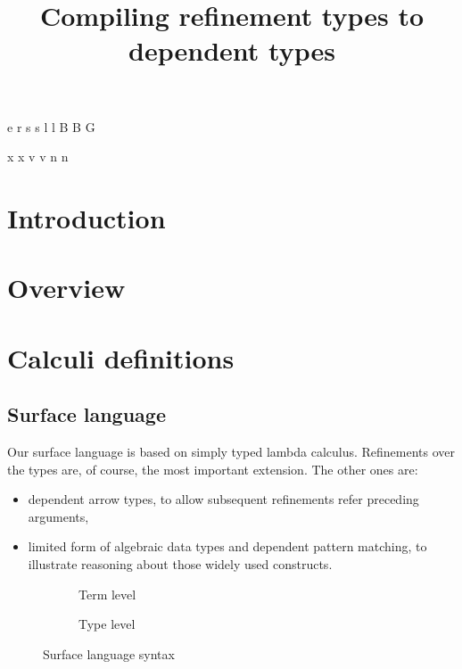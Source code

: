 \documentclass[a4paper]{article}
\begin{document}
\newnonterm e \varepsilon
{}
\newnonterm r \rho
{}
\newnonterm s s
\newnonterm l l
\newnonterm B B
\newnonterm G \Gamma
{}

\newgterm x x
\newgterm v v
\newgterm n n


\title{Compiling refinement types to dependent types}

\maketitle

\section{Introduction}

\section{Overview}


\section{Calculi definitions}

\subsection{Surface language}

Our surface language is based on simply typed lambda calculus.
Refinements over the types are, of course, the most important extension.
The other ones are:
\begin{itemize}
  \item dependent arrow types, to allow subsequent refinements refer preceding arguments,
  \item limited form of algebraic data types and dependent pattern matching,
    to illustrate reasoning about those widely used constructs.
\end{itemize}

\begin{figure}[ht]
  \footnotesize
  \begin{subfigure}{.6\textwidth}
    \caption{Term level}
  \end{subfigure}
  \begin{subfigure}{.5\textwidth}
    \caption{Type level}
  \end{subfigure}
  \caption{Surface language syntax}
  \label{fig:surface_syntax}
\end{figure}
\end{document}
